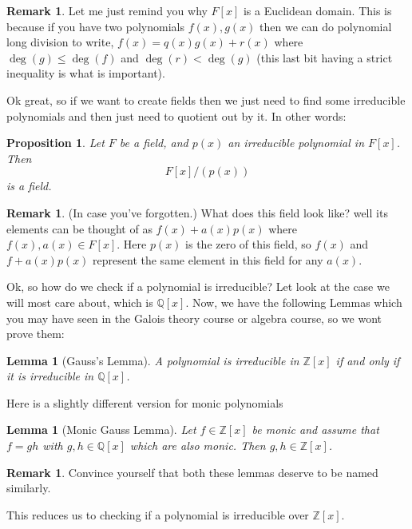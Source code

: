 \documentclass[11pt,a4paper]{report}
\theoremstyle{plain}
\newtheorem{lem}[subsection]{Lemma}
\newtheorem{prop}[subsection]{Proposition}
\theoremstyle{definition}
\theoremstyle{definition}
\newtheorem{rmrk}[subsection]{Remark}
\newcommand{\ZZ}{\mathbb{Z}}
\def\QQ{\mathbb{Q}}
\begin{document}
	\begin{rmrk}
		Let me just remind you why $F[x]$ is a Euclidean domain. This is because if you have two polynomials $f(x),g(x)$ then we can do polynomial long division to write, $f(x)=q(x)g(x)+r(x)$ where $\deg(g) \leq \deg(f)$ and  $\deg(r) < \deg(g)$ (this last bit having a strict inequality is what is important).
	\end{rmrk}
	
	Ok great, so if we want to create fields then we just need to find some irreducible polynomials and then just need to quotient out by it. In other words:
	
	\begin{prop}\label{propo: quot by irr pol gives field}
		Let $F$ be a field, and $p(x)$ an irreducible polynomial in $F[x]$. Then \[F[x]/(p(x))\] is a field.
	\end{prop}
	
	\begin{rmrk}
		(In case you've forgotten.) What does this field look like? well its elements can be thought of as $f(x)+a(x) p(x)$ where $f(x), a(x) \in F[x]$. Here $p(x)$ is the zero of this field, so $f(x)$ and $f+a(x)p(x)$ represent the same element in this field for any $a(x)$.
	\end{rmrk}
	
	
	Ok, so how do we check if a polynomial is irreducible? Let look at the case we will most care about, which is $\QQ[x]$. Now, we have the following Lemmas which you may have seen in the Galois theory course or algebra course, so we wont prove them:
	\begin{lem}[Gauss's Lemma]
		A polynomial is irreducible in $\ZZ[x]$ if and only if it is irreducible in $\QQ[x]$.
	\end{lem}	
	
	Here is a slightly different version for monic polynomials
	
	\begin{lem}[Monic Gauss Lemma]\label{monic gauss}
		Let $f \in \ZZ[x]$ be monic and assume that $f=gh$ with $g,h \in \QQ[x]$ which are also monic. Then $g,h \in \ZZ[x]$. 
	\end{lem}
	
	
	
	
	
	\begin{rmrk}
		Convince yourself that both these lemmas deserve to be named similarly.	
	\end{rmrk}	
	This reduces us to checking if a polynomial is irreducible over $\ZZ[x]$.
	
\end{document}
